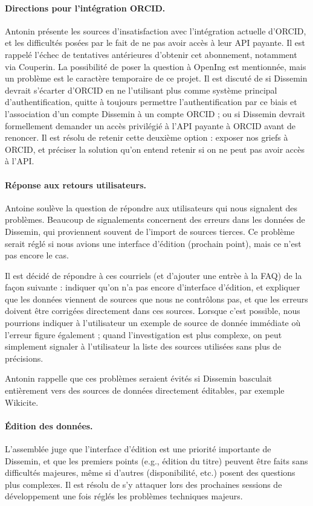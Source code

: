 \documentclass{scrartcl}
\begin{document}
\paragraph{Directions pour l'intégration ORCID.}
Antonin présente les sources d'insatisfaction avec l'intégration actuelle
d'ORCID, et les difficultés posées par le fait de ne pas avoir accès à leur API
payante. Il est rappelé l'échec de tentatives antérieures d'obtenir cet
abonnement, notamment via Couperin. La possibilité de poser la question à
OpenIng est mentionnée, mais un problème est le caractère temporaire de ce
projet. Il est discuté de si Dissemin devrait s'écarter d'ORCID en ne
l'utilisant plus comme système principal d'authentification, quitte à toujours
permettre l'authentification par ce biais et l'association d'un compte Dissemin
à un compte ORCID ; ou si Dissemin devrait formellement demander un accès
privilégié à l'API payante à ORCID avant de renoncer. Il est résolu de retenir
cette deuxième option : exposer nos griefs à ORCID, et préciser la solution
qu'on entend retenir si on ne peut pas avoir accès à l'API.

\paragraph{Réponse aux retours utilisateurs.}
Antoine soulève la question de répondre aux utilisateurs qui nous signalent des problèmes. Beaucoup de signalements concernent des erreurs dans les données de Dissemin, qui proviennent souvent de l'import de sources tierces. Ce problème serait réglé si nous avions une interface d'édition (prochain point), mais ce n'est pas encore le cas.

Il est décidé de répondre à ces courriels (et d'ajouter une entrèe à la FAQ) de la façon suivante : indiquer qu'on n'a pas encore d'interface d'édition, et expliquer que les données viennent de sources que nous ne contrôlons pas, et que les erreurs doivent être corrigées directement dans ces sources. Lorsque c'est possible, nous pourrions indiquer à l'utilisateur un exemple de source de donnée immédiate où l'erreur figure également ; quand l'investigation est plus complexe, on peut simplement signaler à l'utilisateur la liste des sources utilisées sans plus de précisions.

Antonin rappelle que ces problèmes seraient évités si Dissemin basculait entièrement vers des sources de données directement éditables, par exemple Wikicite.

\paragraph{Édition des données.}
L'assemblée juge que l'interface d'édition est une priorité importante de Dissemin, et que les premiers points (e.g., édition du titre) peuvent être faits sans difficultés majeures, même si d'autres (disponibilité, etc.) posent des questions plus complexes. Il est résolu de s'y attaquer lors des prochaines sessions de développement une fois réglés les problèmes techniques majeurs.
\end{document}
